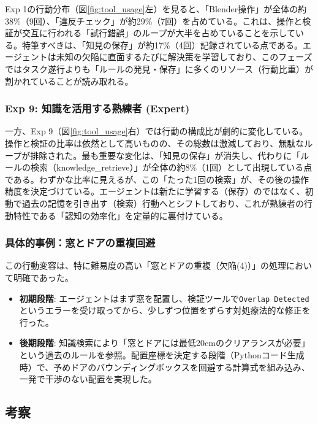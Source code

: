 \documentclass[dvipdfmx, a4paper, 9pt]{deimj}
\begin{document}
Exp 1の行動分布（図\ref{fig:tool_usage}左）を見ると、「Blender操作」が全体の約38\%（9回）、「違反チェック」が約29\%（7回）を占めている。これは、操作と検証が交互に行われる「試行錯誤」のループが大半を占めていることを示している。特筆すべきは、「知見の保存」が約17\%（4回）記録されている点である。エージェントは未知の欠陥に直面するたびに解決策を学習しており、このフェーズではタスク遂行よりも「ルールの発見・保存」に多くのリソース（行動比重）が割かれていることが読み取れる。

\subsubsection{Exp 9: 知識を活用する熟練者 (Expert)}

一方、Exp 9（図\ref{fig:tool_usage}右）では行動の構成比が劇的に変化している。操作と検証の比率は依然として高いものの、その総数は激減しており、無駄なループが排除された。最も重要な変化は、「知見の保存」が消失し、代わりに「ルールの検索（knowledge\_retrieve）」が全体の約8\%（1回）として出現している点である。わずかな比率に見えるが、この「たった1回の検索」が、その後の操作精度を決定づけている。エージェントは新たに学習する（保存）のではなく、初動で過去の記憶を引き出す（検索）行動へとシフトしており、これが熟練者の行動特性である「認知の効率化」を定量的に裏付けている。

\subsubsection{具体的事例：窓とドアの重複回避}

この行動変容は、特に難易度の高い「窓とドアの重複（欠陥(4)）」の処理において明確であった。

\begin{itemize}
  \item \textbf{初期段階}: エージェントはまず窓を配置し、検証ツールで\texttt{Overlap Detected}というエラーを受け取ってから、少しずつ位置をずらす対処療法的な修正を行った。
  \item \textbf{後期段階}: 知識検索により「窓とドアには最低20cmのクリアランスが必要」という過去のルールを参照。配置座標を決定する段階（Pythonコード生成時）で、予めドアのバウンディングボックスを回避する計算式を組み込み、一発で干渉のない配置を実現した。
\end{itemize}

\subsection{考察}
\end{document}
